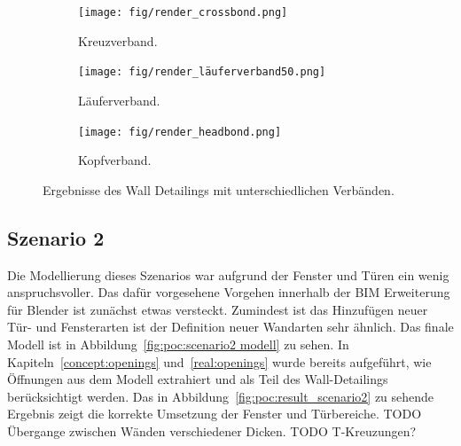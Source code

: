 \begin{figure}[htb]
    \begin{subfigure}[b]{0.3\columnwidth}
      \texttt{[image: fig/render\_crossbond.png]}
      \caption{Kreuzverband.}\label{fig:poc:render_crossbond}
    \end{subfigure}
    \hfill
    \begin{subfigure}[b]{0.3\columnwidth}
      \texttt{[image: fig/render\_läuferverband50.png]}
      \caption{Läuferverband.}\label{fig:poc:render_laeuferverband50}
    \end{subfigure}
    \hfill
    \begin{subfigure}[b]{0.3\columnwidth}
      \texttt{[image: fig/render\_headbond.png]}
      \caption{Kopfverband.}\label{fig:poc:render_headbond}
    \end{subfigure}
    \caption{Ergebnisse des Wall Detailings mit unterschiedlichen Verbänden.}\label{fig:poc:result_scenario1}
\end{figure}

\subsection{Szenario 2}\label{poc:scenario2}
Die Modellierung dieses Szenarios war aufgrund der Fenster und Türen ein wenig anspruchsvoller.
Das dafür vorgesehene Vorgehen innerhalb der BIM Erweiterung für Blender ist zunächst etwas versteckt.
Zumindest ist das Hinzufügen neuer Tür- und Fensterarten ist der Definition neuer Wandarten sehr ähnlich.
Das finale Modell ist in Abbildung~\ref{fig:poc:scenario2 modell} zu sehen.
In Kapiteln~\ref{concept:openings} und~\ref{real:openings} wurde bereits aufgeführt, wie Öffnungen aus dem Modell extrahiert und als Teil des Wall-Detailings berücksichtigt werden.
Das in Abbildung~\ref{fig:poc:result_scenario2} zu sehende Ergebnis zeigt die korrekte Umsetzung der Fenster und Türbereiche.
TODO Übergange zwischen Wänden verschiedener Dicken.
TODO T-Kreuzungen?

